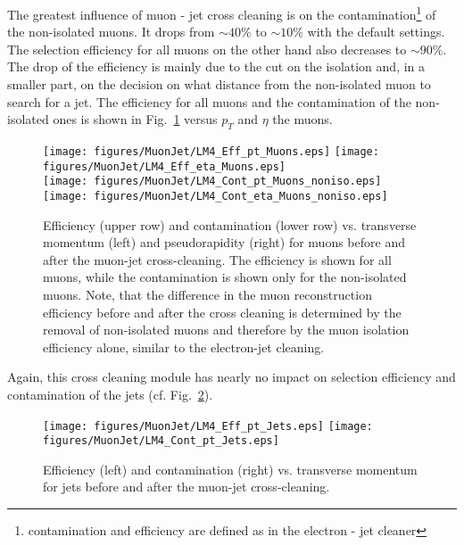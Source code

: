 \documentclass{cmspaper}
\begin{document}
The greatest influence of muon - jet cross cleaning is on the
contamination\footnote{contamination and efficiency are defined as in the
electron - jet cleaner} of the non-isolated muons. It drops from \(\sim 40 \%\)
to \(\sim 10 \%\) with the default settings. The selection efficiency for all
muons on the other hand also decreases to $\sim 90\%$. The
drop of the efficiency is mainly due to the cut on the isolation and, in a
smaller part, on the decision on what distance from the non-isolated muon to
search for a jet. The efficiency for all muons and the contamination of the
non-isolated ones is shown in Fig.~\ref{fig:effCont_muon_MuonJet} versus 
\(p_T\) and \(\eta\) the muons. 

\begin{figure}[hb]
\begin{center}
    \texttt{[image: figures/MuonJet/LM4\_Eff\_pt\_Muons.eps]}
    \texttt{[image: figures/MuonJet/LM4\_Eff\_eta\_Muons.eps]}\\
    \texttt{[image: figures/MuonJet/LM4\_Cont\_pt\_Muons\_noniso.eps]}
    \texttt{[image: figures/MuonJet/LM4\_Cont\_eta\_Muons\_noniso.eps]}
    \caption{Efficiency (upper row) and contamination (lower row) vs.
    transverse momentum (left) and pseudorapidity (right) for muons before and
    after the muon-jet cross-cleaning. The efficiency is shown for all muons,
    while the contamination is shown only for the non-isolated muons. Note, that
    the difference in the muon reconstruction efficiency before and after the
    cross cleaning is determined by the removal of non-isolated muons and
    therefore by the muon isolation efficiency alone, similar to the
    electron-jet cleaning. }
\label{fig:effCont_muon_MuonJet}
\end{center}
\end{figure}

Again, this cross cleaning module has nearly no impact on selection efficiency
and contamination of the jets (cf. Fig.~\ref{fig:effCont_Jets_MuonJet}).

\begin{figure}[hb]
\begin{center}
    \texttt{[image: figures/MuonJet/LM4\_Eff\_pt\_Jets.eps]}
    \texttt{[image: figures/MuonJet/LM4\_Cont\_pt\_Jets.eps]}
    \caption{Efficiency (left) and contamination (right) vs. transverse momentum
    for jets before and after the muon-jet cross-cleaning.}
\label{fig:effCont_Jets_MuonJet}
\end{center}
\end{figure}
\end{document}
